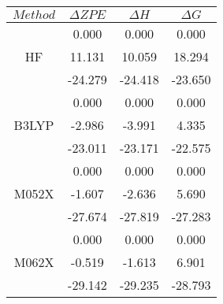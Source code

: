 \begin{tabular}{|c|c|c|c|}
    \hline
    $Method$ & $\Delta ZPE$ & $\Delta H$ & $\Delta G$ \\ \hline
           & 0.000           & 0.000         & 0.000         \\ \hline
    HF     & 11.131          & 10.059        & 18.294        \\ \hline
           & -24.279         & -24.418       & -23.650       \\ \hline
           & 0.000           & 0.000         & 0.000         \\ \hline
    B3LYP  & -2.986          & -3.991        & 4.335         \\ \hline
           & -23.011         & -23.171       & -22.575       \\ \hline
           & 0.000           & 0.000         & 0.000         \\ \hline
    M052X  & -1.607          & -2.636        & 5.690         \\ \hline
           & -27.674         & -27.819       & -27.283       \\ \hline
           & 0.000           & 0.000         & 0.000         \\ \hline
    M062X  & -0.519          & -1.613        & 6.901         \\ \hline
           & -29.142         & -29.235       & -28.793       \\ \hline
\end{tabular}